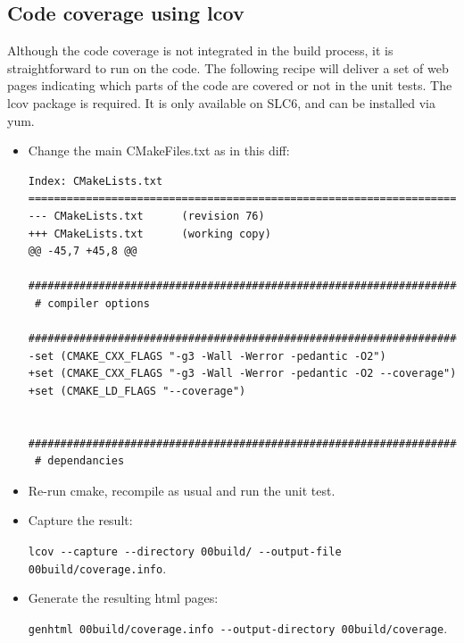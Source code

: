 \subsection{Code coverage using lcov}
Although the code coverage is not integrated in the build process, it is
straightforward to run on the code. The following recipe will deliver a set of 
web pages indicating which parts of the code are covered or not in the unit tests.
The lcov package is required. It is only available on SLC6, and can be installed via yum.
\begin{itemize}
\item{}Change the main CMakeFiles.txt as in this diff:
\begin{small}
\begin{verbatim}
Index: CMakeLists.txt
===================================================================
--- CMakeLists.txt      (revision 76)
+++ CMakeLists.txt      (working copy)
@@ -45,7 +45,8 @@
 ###########################################################################
 # compiler options
 ###########################################################################
-set (CMAKE_CXX_FLAGS "-g3 -Wall -Werror -pedantic -O2")
+set (CMAKE_CXX_FLAGS "-g3 -Wall -Werror -pedantic -O2 --coverage")
+set (CMAKE_LD_FLAGS "--coverage")

 ###########################################################################
 # dependancies
\end{verbatim}
\end{small}

\item{}Re-run cmake, recompile as usual and run the unit test.
\item{}Capture the result:

        \small{}\verb#lcov --capture --directory 00build/ --output-file 00build/coverage.info#.
\item{}\normalsize{}Generate the resulting html pages: 
        
        \small{}\verb#genhtml 00build/coverage.info --output-directory 00build/coverage#.
\end{itemize}
